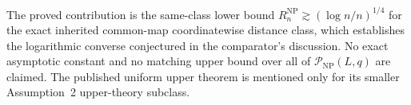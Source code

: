 The proved contribution is the same-class lower bound \(R_n^{\mathrm{NP}}\gtrsim(\log n/n)^{1/4}\) for the exact inherited common-map coordinatewise distance class, which establishes the logarithmic converse conjectured in the comparator's discussion.  No exact asymptotic constant and no matching upper bound over all of \(\mathcal P_{\mathrm{NP}}(L,q)\) are claimed.  The published uniform upper theorem is mentioned only for its smaller Assumption~2 upper-theory subclass.